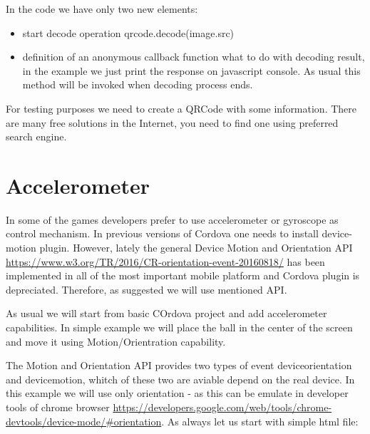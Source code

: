 \begin{explain}
  In the code we have only two new elements: 
  \begin{itemize}
  \item start decode operation qrcode.decode(image.src) 
  \item definition of an anonymous callback function what to do with decoding result, in the example we just print the response on javascript console. As usual this method will be invoked when decoding process ends.
  \end{itemize}
\end{explain}

\begin{remark}
For testing purposes we need to create a QRCode with some information. There are many free solutions in the Internet, you need to find one using preferred search engine.
\end{remark}

\section{Accelerometer}
In some of the games developers prefer to use accelerometer or gyroscope as control mechanism. In previous versions of Cordova one needs to install device-motion plugin. However, lately the general Device Motion and Orientation API \url{https://www.w3.org/TR/2016/CR-orientation-event-20160818/} has been implemented in all of the most important mobile platform and Cordova plugin is depreciated. Therefore, as suggested we will use mentioned API. 

As usual we will start from basic COrdova project and add accelerometer capabilities. In simple example we will place the ball in the center of the screen and move it using Motion/Orientration capability.

The Motion and Orientation API provides two types of event deviceorientation and devicemotion, whitch of these two are aviable depend on the real device. In this example we will use only orientation - as this can be emulate in developer tools of chrome browser \url{https://developers.google.com/web/tools/chrome-devtools/device-mode/#orientation}. As always let us start with simple html file:



